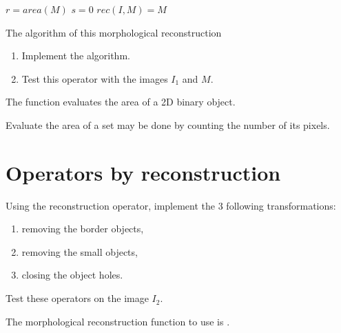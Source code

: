 \begin{algorithm}[H]
\SetAlgoLined
{}
$r=area(M)$\;
$s=0$\;
$rec(I,M)=M$\;
\caption{The algorithm of this morphological reconstruction}
\end{algorithm}

\begin{qbox}
\begin{enumerate}
\item Implement the algorithm.
\item Test this operator with the images $I_1$ and $M$.
\end{enumerate}
\end{qbox}

\begin{mcomment}

\begin{mremark}
The function  evaluates the area of a 2D binary object.
\end{mremark} 
\end{mcomment}

\begin{pcomment}
 \begin{premark}
  Evaluate the area of a set may be done  by counting the number of its pixels.
 \end{premark}

\end{pcomment}



\section{Operators by reconstruction}
\begin{qbox}
Using the reconstruction operator, implement the 3 following transformations:
\begin{enumerate}
   \item removing the border objects,
	\item removing the small objects,
	\item closing the object holes.
\end{enumerate}
Test these operators on the image $I_2$.
\end{qbox}

\begin{mcomment}
\begin{mremark}
The morphological reconstruction function to use is .
\end{mremark}
\end{mcomment}

